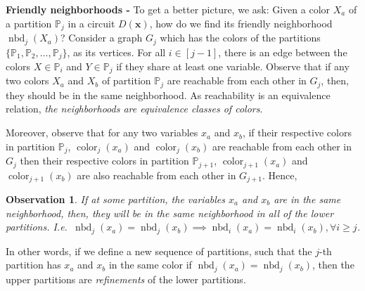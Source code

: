 \documentclass[final,oneeqnum, onethmnum, onefignum]{siamltex1213}
\renewcommand{\P}{\mathbb P}
\newcommand{\abs}[1]{\lvert #1 \rvert}
\DeclareMathOperator{\nbd}{nbd}
\DeclareMathOperator{\Color}{color}
\newtheorem{observation}[theorem]{Observation}
\begin{document}
\noindent \textbf{Friendly neighborhoods -} To get a better picture, we ask: Given a color $X_a$ of a partition $\P_j$ in a circuit $D(\mathbf{x})$,
how do we find its friendly neighborhood $\nbd_j(X_a)$?
Consider a graph $G_j$ which has the colors of the partitions $\{ \P_1, \P_2, \dots, \P_j \}$, 
as its vertices. 
For all $i \in [j-1]$, there is an edge between the colors $X \in \P_{i}$ and 
$Y \in \P_{j}$ if they share at least one variable.
Observe that if any two colors $X_a$ and $X_b$ of partition $\P_j$
are reachable from each other in $G_j$,
then, they should be in the same neighborhood.
As reachability is an equivalence relation, {\em the neighborhoods are equivalence classes of colors}. 

Moreover, observe that for any two variables $x_a$ and $x_b$,
if their respective colors in partition $\P_j$, $\Color_j(x_a)$ and $\Color_j(x_b)$
are reachable from each other in $G_j$
then their respective colors in partition $\P_{j+1}$, 
$\Color_{j+1}(x_a)$ and $\Color_{j+1}(x_b)$
are also reachable from each other in $G_{j+1}$. Hence,
\begin{observation}
\label{obs:zeroBelow}
If at some partition,
the variables $x_a$ and $x_b$ are in the same neighborhood,
then, they will be in the same neighborhood in all of the lower partitions.
I.e.\ $\nbd_j(x_a) = \nbd_j(x_b) \implies \nbd_i(x_a) = \nbd_i(x_b), \forall i \ge j$.
\end{observation}
In other words, if we define a new sequence of partitions,
such that the $j$-th partition has $x_a$ and $x_b$ in the same color if $\nbd_j(x_a) = \nbd_j(x_b)$, 
then the upper partitions are {\em refinements} of the lower partitions. 



%
\end{document}
